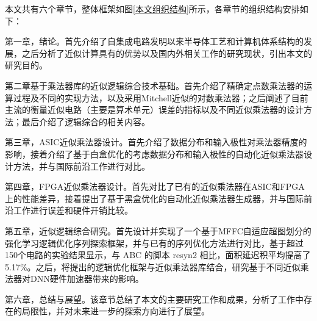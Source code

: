 本文共有六个章节，整体框架如图\ref{本文组织结构}所示，各章节的组织结构安排如下：

第一章，绪论。首先介绍了自集成电路发明以来半导体工艺和计算机体系结构的发展，之后分析了近似计算具有的优势以及国内外相关工作的研究现状，引出本文的研究目的。

第二章基于乘法器库的近似逻辑综合技术基础。首先介绍了精确定点数乘法器的运算过程及不同的实现方法，以及采用Mitchell近似的对数乘法器\cite{EM:mitchell}；之后阐述了目前主流的衡量近似电路（主要是算术单元）误差的指标以及不同近似乘法器的设计方法；最后介绍了逻辑综合的相关内容。

第三章，ASIC近似乘法器设计。首先介绍了数据分布和输入极性对乘法器精度的影响，接着介绍了基于白盒优化的考虑数据分布和输入极性的自动化近似乘法器设计方法，并与国际前沿工作进行对比。

第四章，FPGA近似乘法器设计。首先对比了已有的近似乘法器在ASIC和FPGA上的性能差异，接着提出了基于黑盒优化的自动化近似乘法器生成器，并与国际前沿工作进行误差和硬件开销比较。

第五章，近似逻辑综合研究。首先设计并实现了一个基于MFFC自适应超图划分的强化学习逻辑优化序列探索框架，并与已有的序列优化方法进行对比，基于超过 150个电路的实验结果显示，与 ABC 的脚本 resyn2 相比，面积延迟积平均提高了5.17\%。之后，将提出的逻辑优化框架与近似乘法器库结合，研究基于不同近似乘法器对DNN硬件加速器带来的影响。

第六章，总结与展望。该章节总结了本文的主要研究工作和成果，分析了工作中存在的局限性，并对未来进一步的探索方向进行了展望。

